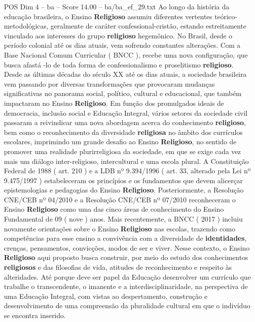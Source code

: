 \begin{textsample}{POS Dim 4 – ba – Score 14.00 – ba/ba\_ef\_29.txt}  \label{ex:f4_pos_029}
Ao longo da história da educação brasileira, o Ensino \textbf{Religioso} assumiu diferentes vertentes teórico-metodológicas, geralmente de caráter confessional-cristão, estando estreitamente vinculado aos interesses do grupo \textbf{religioso} hegemônico.
No Brasil, desde o período colonial até os dias atuais, vem sofrendo constantes alterações.
Com a Base Nacional Comum Curricular ( BNCC ), recebe uma nova configuração, que busca afastá -lo de toda forma de confessionalismo e proselitismo \textbf{religioso}.
Desde as últimas décadas do século XX até os dias atuais, a sociedade brasileira vem passando por diversas transformações que provocaram mudanças significativas no panorama social, político, cultural e educacional, que também impactaram no Ensino \textbf{Religioso}.
Em função dos promulgados ideais de democracia, inclusão social e Educação Integral, vários setores da sociedade civil passaram a reivindicar uma nova abordagem acerca do conhecimento \textbf{religioso}, bem como o reconhecimento da diversidade \textbf{religiosa} no âmbito dos currículos escolares, imprimindo um grande desafio ao Ensino \textbf{Religioso}, no sentido de promover uma realidade plurirreligiosa da sociedade, em que se exige cada vez mais um diálogo inter-religioso, intercultural e uma escola plural.
A Constituição Federal de 1988 ( art. 210 ) e a LDB nº 9.394/1996 ( art. 33, alterado pela Lei nº 9.475/1997 ) estabeleceram os princípios e os fundamentos que devem alicerçar epistemologias e pedagogias do Ensino \textbf{Religioso}.
Posteriormente, a Resolução CNE/CEB nº 04/2010 e a Resolução CNE/CEB nº 07/2010 reconheceram o Ensino \textbf{Religioso} como uma das cinco áreas de conhecimento do Ensino Fundamental de 09 ( nove ) anos.
Mais recentemente, a BNCC ( 2017 ) incluiu novamente orientações sobre o Ensino \textbf{Religioso} nas escolas, trazendo como competências para esse ensino a convivência com a diversidade de \textbf{identidades}, crenças, pensamentos, convicções, modos de ser e viver.
Nesse contexto, o Ensino \textbf{Religioso} aqui proposto busca construir, por meio do estudo dos conhecimentos \textbf{religiosos} e das filosofias de vida, atitudes de reconhecimento e respeito às alteridades.
Até porque deve ser papel da Educação desenvolver um currículo que trabalhe o transcendente, o imanente e a interdisciplinaridade, na perspectiva de uma Educação Integral, com vistas ao despertamento, construção e desenvolvimento de uma compreensão da pluralidade cultural em que o indivíduo se encontra inserido.

\end{textsample}
